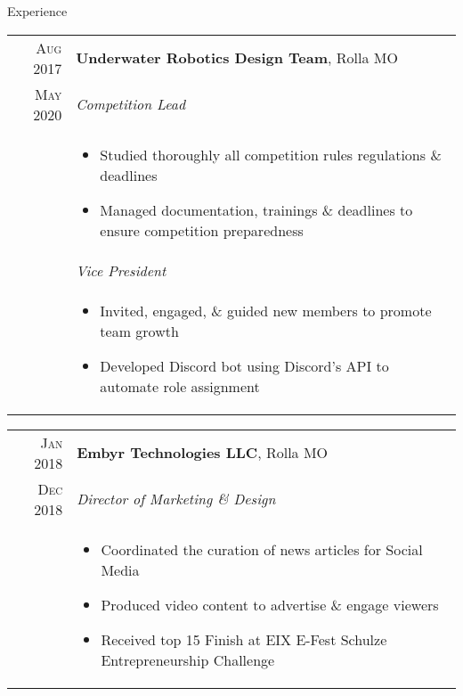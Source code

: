 \documentclass{resume}
\begin{document}
\begin{rSection}{Experience}
{    \begin{tabular}{r|p{15cm}}
        \textsc{Aug 2017} & \textbf{Underwater Robotics Design Team}, Rolla MO \\
        \textsc{May 2020}  & \textit{Competition Lead} \\ &
        \begin{itemize}
            \item {Studied thoroughly all competition rules regulations \& deadlines}
            \item {Managed documentation, trainings \& deadlines to ensure competition preparedness}
        \end{itemize}\\ &
        \textit{Vice President} \\ &
        \begin{itemize}
            \item {Invited, engaged, \& guided new members to promote team growth}
            \item {Developed Discord bot using Discord's API to automate role assignment}
        \end{itemize}
    \end{tabular}

    \begin{tabular}{r|p{15cm}}
        \textsc{Jan 2018} & \textbf{Embyr Technologies LLC}, Rolla MO \\
        \textsc{Dec 2018}  & \textit{Director of Marketing \& Design} \\ &
        \begin{itemize}
            \item {Coordinated the curation of news articles for Social Media}
            \item {Produced video content to advertise \& engage viewers}
            \item {Received top 15 Finish at EIX E-Fest Schulze Entrepreneurship Challenge}
        \end{itemize}
    \end{tabular}
}
\end{rSection}
\end{document}
